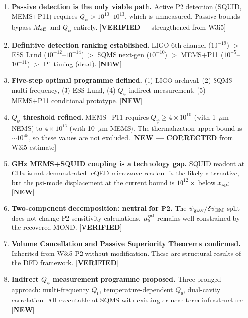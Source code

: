 \documentclass[11pt]{article}
\newcommand{\Meff}{M_{\rm eff}}
\newcommand{\ee}[1]{\times 10^{#1}}
\newcommand{\Qpsi}{Q_\psi}
\newcommand{\muG}{\mu_0^{\rm gal}}
\newcommand{\psigrav}{\psi_{\rm grav}}
\newcommand{\dpsiEM}{\delta\psi_{\rm EM}}
\theoremstyle{definition}
\theoremstyle{remark}
\begin{document}
\begin{tcolorbox}[colback=blue!3!white, colframe=blue!50!black,
  title=\textbf{W3i6 P2: Summary of Findings and Corrections}]

\begin{enumerate}[label=\textbf{\arabic*.}, itemsep=4pt]

\item \textbf{Passive detection is the only viable path.}
  Active P2 detection (SQUID, MEMS+P11) requires $\Qpsi > 10^{10}$--$10^{13}$,
  which is unmeasured. Passive bounds bypass $\Meff$ and $\Qpsi$ entirely.
  [\textbf{VERIFIED} --- strengthened from W3i5]

\item \textbf{Definitive detection ranking established.}
  LIGO 6th channel ($10^{-19}$) $>$ ESS Lund ($10^{-12}$--$10^{-14}$) $>$
  SQMS next-gen ($10^{-10}$) $>$ MEMS+P11 ($10^{-5}$--$10^{-11}$) $>$
  P1 timing (dead). [\textbf{NEW}]

\item \textbf{Five-step optimal programme defined.}
  (1) LIGO archival, (2) SQMS multi-frequency, (3) ESS Lund,
  (4) $\Qpsi$ indirect measurement, (5) MEMS+P11 conditional prototype.
  [\textbf{NEW}]

\item \textbf{$\Qpsi$ threshold refined.}
  MEMS+P11 requires $\Qpsi \geq 4\ee{10}$ (with 1~$\mu$m NEMS) to
  $4\ee{13}$ (with 10~$\mu$m MEMS). The thermalization upper bound is
  $\sim 10^{45}$, so these values are not excluded. [\textbf{NEW --- CORRECTED}
  from W3i5 estimate]

\item \textbf{GHz MEMS+SQUID coupling is a technology gap.}
  SQUID readout at GHz is not demonstrated. cQED microwave readout is
  the likely alternative, but the psi-mode displacement at the current
  bound is $10^{12}\times$ below $x_{\rm zpf}$. [\textbf{NEW}]

\item \textbf{Two-component decomposition: neutral for P2.}
  The $\psigrav/\dpsiEM$ split does not change P2 sensitivity
  calculations. $\muG$ remains well-constrained by the recovered MOND.
  [\textbf{VERIFIED}]

\item \textbf{Volume Cancellation and Passive Superiority Theorems confirmed.}
  Inherited from W3i5-P2 without modification. These are structural
  results of the DFD framework. [\textbf{VERIFIED}]

\item \textbf{Indirect $\Qpsi$ measurement programme proposed.}
  Three-pronged approach: multi-frequency $Q_0$, temperature-dependent
  $Q_0$, dual-cavity correlation. All executable at SQMS with existing
  or near-term infrastructure. [\textbf{NEW}]

\end{enumerate}
\end{tcolorbox}
\end{document}
